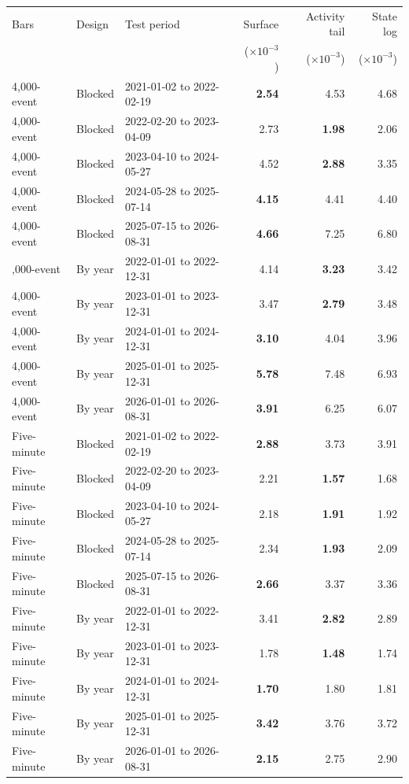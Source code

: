 \begin{tabular}{lllrrr}
\toprule
Bars & Design & Test period & Surface & Activity tail & State log \\
 &  &  & (\(\times 10^{-3}\)) & (\(\times 10^{-3}\)) & (\(\times 10^{-3}\)) \\
\midrule
4,000-event & Blocked & 2021-01-02 to 2022-02-19 & \textbf{2.54} & 4.53 & 4.68 \\
4,000-event & Blocked & 2022-02-20 to 2023-04-09 & 2.73 & \textbf{1.98} & 2.06 \\
4,000-event & Blocked & 2023-04-10 to 2024-05-27 & 4.52 & \textbf{2.88} & 3.35 \\
4,000-event & Blocked & 2024-05-28 to 2025-07-14 & \textbf{4.15} & 4.41 & 4.40 \\
4,000-event & Blocked & 2025-07-15 to 2026-08-31 & \textbf{4.66} & 7.25 & 6.80 \\
\addlinespace
4,000-event & By year & 2022-01-01 to 2022-12-31 & 4.14 & \textbf{3.23} & 3.42 \\
4,000-event & By year & 2023-01-01 to 2023-12-31 & 3.47 & \textbf{2.79} & 3.48 \\
4,000-event & By year & 2024-01-01 to 2024-12-31 & \textbf{3.10} & 4.04 & 3.96 \\
4,000-event & By year & 2025-01-01 to 2025-12-31 & \textbf{5.78} & 7.48 & 6.93 \\
4,000-event & By year & 2026-01-01 to 2026-08-31 & \textbf{3.91} & 6.25 & 6.07 \\
\addlinespace
Five-minute & Blocked & 2021-01-02 to 2022-02-19 & \textbf{2.88} & 3.73 & 3.91 \\
Five-minute & Blocked & 2022-02-20 to 2023-04-09 & 2.21 & \textbf{1.57} & 1.68 \\
Five-minute & Blocked & 2023-04-10 to 2024-05-27 & 2.18 & \textbf{1.91} & 1.92 \\
Five-minute & Blocked & 2024-05-28 to 2025-07-14 & 2.34 & \textbf{1.93} & 2.09 \\
Five-minute & Blocked & 2025-07-15 to 2026-08-31 & \textbf{2.66} & 3.37 & 3.36 \\
\addlinespace
Five-minute & By year & 2022-01-01 to 2022-12-31 & 3.41 & \textbf{2.82} & 2.89 \\
Five-minute & By year & 2023-01-01 to 2023-12-31 & 1.78 & \textbf{1.48} & 1.74 \\
Five-minute & By year & 2024-01-01 to 2024-12-31 & \textbf{1.70} & 1.80 & 1.81 \\
Five-minute & By year & 2025-01-01 to 2025-12-31 & \textbf{3.42} & 3.76 & 3.72 \\
Five-minute & By year & 2026-01-01 to 2026-08-31 & \textbf{2.15} & 2.75 & 2.90 \\
\bottomrule
\end{tabular}
